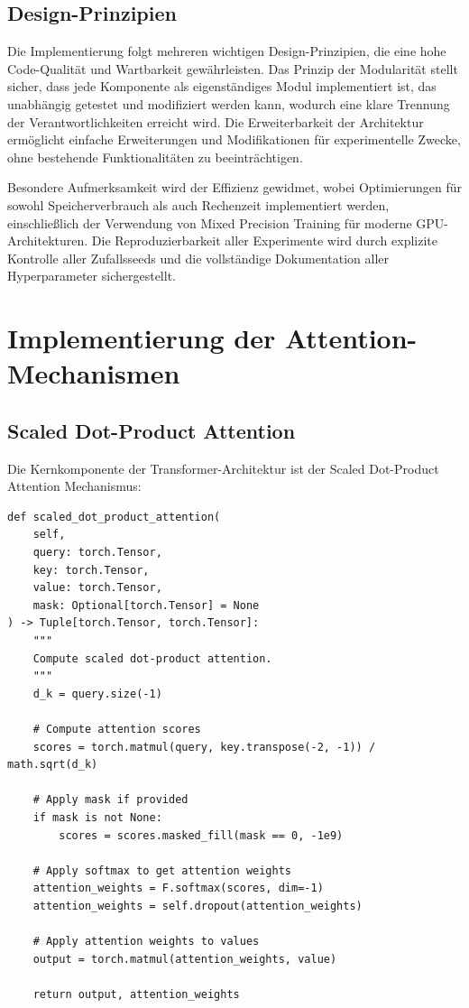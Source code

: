 \subsection{Design-Prinzipien}

Die Implementierung folgt mehreren wichtigen Design-Prinzipien, die eine hohe Code-Qualität und Wartbarkeit gewährleisten. Das Prinzip der Modularität stellt sicher, dass jede Komponente als eigenständiges Modul implementiert ist, das unabhängig getestet und modifiziert werden kann, wodurch eine klare Trennung der Verantwortlichkeiten erreicht wird. Die Erweiterbarkeit der Architektur ermöglicht einfache Erweiterungen und Modifikationen für experimentelle Zwecke, ohne bestehende Funktionalitäten zu beeinträchtigen.

Besondere Aufmerksamkeit wird der Effizienz gewidmet, wobei Optimierungen für sowohl Speicherverbrauch als auch Rechenzeit implementiert werden, einschließlich der Verwendung von Mixed Precision Training für moderne GPU-Architekturen. Die Reproduzierbarkeit aller Experimente wird durch explizite Kontrolle aller Zufallsseeds und die vollständige Dokumentation aller Hyperparameter sichergestellt.

\section{Implementierung der Attention-Mechanismen}

\subsection{Scaled Dot-Product Attention}

Die Kernkomponente der Transformer-Architektur ist der Scaled Dot-Product Attention Mechanismus:

\begin{lstlisting}[style=pythonstyle, caption=Scaled Dot-Product Attention Implementierung]
def scaled_dot_product_attention(
    self, 
    query: torch.Tensor, 
    key: torch.Tensor, 
    value: torch.Tensor, 
    mask: Optional[torch.Tensor] = None
) -> Tuple[torch.Tensor, torch.Tensor]:
    """
    Compute scaled dot-product attention.
    """
    d_k = query.size(-1)
    
    # Compute attention scores
    scores = torch.matmul(query, key.transpose(-2, -1)) / math.sqrt(d_k)
    
    # Apply mask if provided
    if mask is not None:
        scores = scores.masked_fill(mask == 0, -1e9)
    
    # Apply softmax to get attention weights
    attention_weights = F.softmax(scores, dim=-1)
    attention_weights = self.dropout(attention_weights)
    
    # Apply attention weights to values
    output = torch.matmul(attention_weights, value)
    
    return output, attention_weights
\end{lstlisting}


